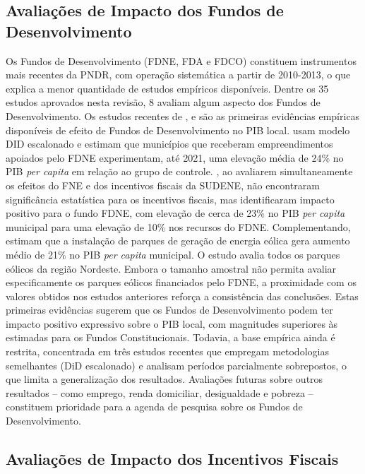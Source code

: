 \subsection{Avaliações de Impacto dos Fundos de Desenvolvimento}

Os Fundos de Desenvolvimento (FDNE, FDA e FDCO) constituem instrumentos mais recentes da PNDR, com operação sistemática a partir de 2010-2013, o que explica a menor quantidade de estudos empíricos disponíveis. Dentre os 35 estudos aprovados nesta revisão, 8 avaliam algum aspecto dos Fundos de Desenvolvimento. Os estudos recentes de ,  e  são as primeiras evidências empíricas disponíveis de efeito de Fundos de Desenvolvimento no PIB local.  usam modelo DID escalonado e estimam que municípios que receberam empreendimentos apoiados pelo FDNE experimentam, até 2021, uma elevação média de 24\% no PIB \textit{per capita} em relação ao grupo de controle. , ao avaliarem simultaneamente os efeitos do FNE e dos incentivos fiscais da SUDENE, não encontraram significância estatística para os incentivos fiscais, mas identificaram impacto positivo para o fundo FDNE, com elevação de cerca de 23\% no PIB \textit{per capita} municipal para uma elevação de 10\% nos recursos do FDNE. Complementando,  estimam que a instalação de parques de geração de energia eólica gera aumento médio de 21\% no PIB \textit{per capita} municipal. O estudo avalia todos os parques eólicos da região Nordeste. Embora o tamanho amostral não permita avaliar especificamente os parques eólicos financiados pelo FDNE, a proximidade com os valores obtidos nos estudos anteriores reforça a consistência das conclusões. Estas primeiras evidências sugerem que os Fundos de Desenvolvimento podem ter impacto positivo expressivo sobre o PIB local, com magnitudes superiores às estimadas para os Fundos Constitucionais. Todavia, a base empírica ainda é restrita, concentrada em três estudos recentes que empregam metodologias semelhantes (DiD escalonado) e analisam períodos parcialmente sobrepostos, o que limita a generalização dos resultados. Avaliações futuras sobre outros resultados -- como emprego, renda domiciliar, desigualdade e pobreza -- constituem prioridade para a agenda de pesquisa sobre os Fundos de Desenvolvimento.

\subsection{Avaliações de Impacto dos Incentivos Fiscais}

